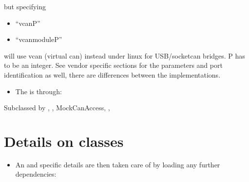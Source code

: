 \documentclass[a4paper,10pt,english]{sphinxmanual}
\begin{document}
\sphinxAtStartPar
but specifying
\begin{itemize}
\item {} 
\sphinxAtStartPar
“vcanP”

\item {} 
\sphinxAtStartPar
“vcanmoduleP”

\end{itemize}

\sphinxAtStartPar
will use vcan (virtual can) instead under linux for USB/socketcan bridges. P has to be an integer.
See vendor specific sections for the parameters and port identification as well, there are differences between
the implementations.
\begin{itemize}
\item {} 
\sphinxAtStartPar
The  is through:

\end{itemize}

\begin{fulllineitems}
%
\pysigstartmultiline
{}%
\pysigstopmultiline
\sphinxAtStartPar
Subclassed by {\hyperref[\detokenize{classesdetails:classAnaCanScan}]{}}, {\hyperref[\detokenize{vendors/systec:classCSockCanScan}]{}}, MockCanAccess, {\hyperref[\detokenize{vendors/peak:classPKCanScan}]{}}, {\hyperref[\detokenize{classesdetails:classSTCanScan}]{}}

\end{fulllineitems}



\chapter{Details on classes}
\label{\detokenize{classesdetails:details-on-classes}}\label{\detokenize{classesdetails::doc}}\begin{itemize}
\item {} 
\sphinxAtStartPar
An  and specific details are then taken care of by loading any further dependencies:

\end{itemize}
\end{document}
